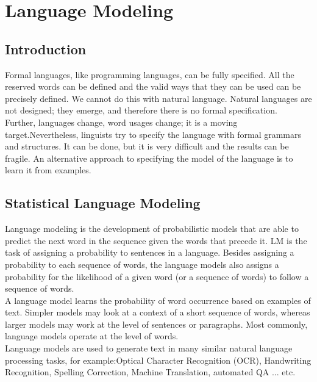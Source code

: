 \section{Language Modeling}
\label{chap:Language Modeling}

\subsection{Introduction}
Formal languages, like programming languages, can be fully specified.
All the reserved words can be defined and the valid ways that they can be used can be precisely defined.
We cannot do this with natural language. Natural languages are not designed; they emerge, and therefore there is no formal specification.\\
Further, languages change, word usages change; it is a moving target.Nevertheless, linguists try to specify the language with formal grammars and structures. It can be done, but it is very difficult and the results can be fragile.
An alternative approach to specifying the model of the language is to learn it from examples.\cite{web012}
\subsection{Statistical Language Modeling}
Language modeling is the development of probabilistic models that are able to predict the next word in the sequence given the words that precede it. LM is the task of assigning a probability to sentences in a language. Besides assigning a probability to each sequence of words, the language models also assigns a probability for the likelihood of a given word (or a sequence of words) to follow a sequence of words. \\A language model learns the probability of word occurrence based on examples of text. Simpler models may look at a context of a short sequence of words, whereas larger models may work at the level of sentences or paragraphs. Most commonly, language models operate at the level of words.\\
Language models are used to generate text in many similar natural language processing tasks, for example:Optical Character Recognition (OCR), Handwriting Recognition, Spelling Correction, Machine Translation, automated QA ... etc.
